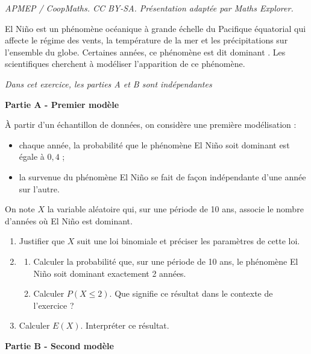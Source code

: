 \documentclass[10pt]{article}
\begin{document}
\noindent\textit{APMEP / CoopMaths. CC BY-SA. Présentation adaptée par Maths Explorer.}\par\medskip
\medskip

El Niño est un phénomène océanique à grande échelle du Pacifique équatorial qui affecte le régime des vents, la température de la mer et les précipitations sur l’ensemble du globe. Certaines années, ce phénomène est dit \og dominant \fg. Les scientifiques cherchent à modéliser l’apparition de ce phénomène.

\begin{center}\emph{Dans cet exercice, les parties A et B sont indépendantes}\end{center}

\medskip

\textbf{Partie A - Premier modèle}

\medskip

À partir d’un échantillon de données, on considère une première modélisation :

\begin{itemize}
\item chaque année, la probabilité que le phénomène El Niño soit dominant est égale à $0,4$ ;
\item la survenue du phénomène El Niño se fait de façon indépendante d’une année sur
l’autre.
\end{itemize}

On note $X$ la variable aléatoire qui, sur une période de 10 ans, associe le nombre d’années où El Niño est dominant.

\medskip

\begin{enumerate}
\item Justifier que $X$ suit une loi binomiale et préciser les paramètres de cette loi.
\item 
	\begin{enumerate}
		\item Calculer la probabilité que, sur une période de 10 ans, le phénomène El Niño soit dominant exactement 2 années.
		\item Calculer $P(X \leqslant 2)$. Que signifie ce résultat dans le contexte de l’exercice ?
	\end{enumerate}
\item Calculer $E(X)$. Interpréter ce résultat.
\end{enumerate}

\medskip

\textbf{Partie B - Second modèle}
\end{document}
